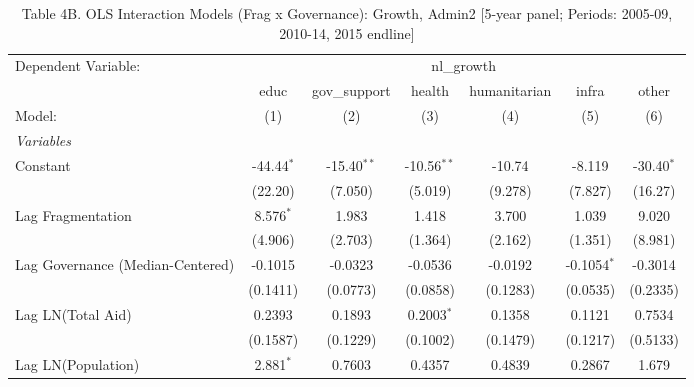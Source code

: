 
\begin{table}[H]
   \caption{Table 4B. OLS Interaction Models (Frag x Governance): Growth, Admin2 [5-year panel; Periods: 2005-09, 2010-14, 2015 endline]}
   \centering
   \begin{tabular}{lcccccc}
      \tabularnewline \midrule \midrule
      Dependent Variable: & \multicolumn{6}{c}{nl\_growth}\\
                                                           & educ         & gov\_support  & health        & humanitarian & infra         & other \\   
      Model:                                               & (1)          & (2)           & (3)           & (4)          & (5)           & (6)\\  
      \midrule
      \emph{Variables}\\
      Constant                                             & -44.44$^{*}$ & -15.40$^{**}$ & -10.56$^{**}$ & -10.74       & -8.119        & -30.40$^{*}$\\   
                                                           & (22.20)      & (7.050)       & (5.019)       & (9.278)      & (7.827)       & (16.27)\\   
      Lag Fragmentation                                    & 8.576$^{*}$  & 1.983         & 1.418         & 3.700        & 1.039         & 9.020\\   
                                                           & (4.906)      & (2.703)       & (1.364)       & (2.162)      & (1.351)       & (8.981)\\   
      Lag Governance (Median-Centered)                     & -0.1015      & -0.0323       & -0.0536       & -0.0192      & -0.1054$^{*}$ & -0.3014\\   
                                                           & (0.1411)     & (0.0773)      & (0.0858)      & (0.1283)     & (0.0535)      & (0.2335)\\   
      Lag LN(Total Aid)                                    & 0.2393       & 0.1893        & 0.2003$^{*}$  & 0.1358       & 0.1121        & 0.7534\\   
                                                           & (0.1587)     & (0.1229)      & (0.1002)      & (0.1479)     & (0.1217)      & (0.5133)\\   
      Lag LN(Population)                                   & 2.881$^{*}$  & 0.7603        & 0.4357        & 0.4839       & 0.2867        & 1.679\\   

\end{tabular}
\end{table}
